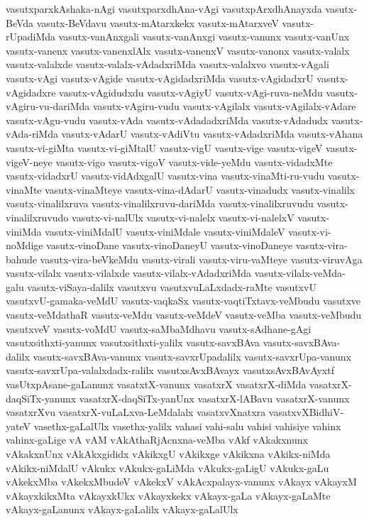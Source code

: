 {vasutxparxkAshaka-nAgi
vasutxparxdhAna-vAgi
vasutxpArxdhAnayxda
vasutx-BeVda
vasutx-BeVdavu
vasutx-mAtarxkekx
vasutx-mAtarxveV
vasutx-rUpadiMda
vasutx-vanAnxgali
vasutx-vanAnxgi
vasutx-vanunx
vasutx-vanUnx
vasutx-vanenx
vasutx-vanenxlAlx
vasutx-vanenxV
vasutx-vanonx
vasutx-valalx
vasutx-valalxde
vasutx-valalx-vAdadxriMda
vasutx-valalxvo
vasutx-vAgali
vasutx-vAgi
vasutx-vAgide
vasutx-vAgidadxriMda
vasutx-vAgidadxrU
vasutx-vAgidadxre
vasutx-vAgidudxdu
vasutx-vAgiyU
vasutx-vAgi-ruva-neMdu
vasutx-vAgiru-vu-dariMda
vasutx-vAgiru-vudu
vasutx-vAgilalx
vasutx-vAgilalx-vAdare
vasutx-vAgu-vudu
vasutx-vAda
vasutx-vAdadadxriMda
vasutx-vAdadudx
vasutx-vAda-riMda
vasutx-vAdarU
vasutx-vAdiVtu
vasutx-vAdadxriMda
vasutx-vAhana
vasutx-vi-giMta
vasutx-vi-giMtalU
vasutx-vigU
vasutx-vige
vasutx-vigeV
vasutx-vigeV-neye
vasutx-vigo
vasutx-vigoV
vasutx-vide-yeMdu
vasutx-vidadxMte
vasutx-vidadxrU
vasutx-vidAdxgalU
vasutx-vina
vasutx-vinaMti-ru-vudu
vasutx-vinaMte
vasutx-vinaMteye
vasutx-vina-dAdarU
vasutx-vinadudx
vasutx-vinalilx
vasutx-vinalilxruva
vasutx-vinalilxruvu-dariMda
vasutx-vinalilxruvudu
vasutx-vinalilxruvudo
vasutx-vi-nalUlx
vasutx-vi-nalelx
vasutx-vi-nalelxV
vasutx-viniMda
vasutx-viniMdalU
vasutx-viniMdale
vasutx-viniMdaleV
vasutx-vi-noMdige
vasutx-vinoDane
vasutx-vinoDaneyU
vasutx-vinoDaneye
vasutx-vira-bahude
vasutx-vira-beVkeMdu
vasutx-virali
vasutx-viru-vaMteye
vasutx-viruvAga
vasutx-vilalx
vasutx-vilalxde
vasutx-vilalx-vAdadxriMda
vasutx-vilalx-veMda-galu
vasutx-viSaya-dalilx
vasutxvu
vasutxvuLaLxdadx-raMte
vasutxvU
vasutxvU-gamaka-veMdU
vasutx-vaqkaSx
vasutx-vaqtiTxtavx-veMbudu
vasutxve
vasutx-veMdathaR
vasutx-veMdu
vasutx-veMdeV
vasutx-veMba
vasutx-veMbudu
vasutxveV
vasutx-voMdU
vasutx-saMbaMdhavu
vasutx-sAdhane-gAgi
vasutxsithxti-yanunx
vasutxsithxti-yalilx
vasutx-savxBAva
vasutx-savxBAva-dalilx
vasutx-savxBAva-vanunx
vasutx-savxrUpadalilx
vasutx-savxrUpa-vanunx
vasutx-savxrUpa-valalxdadx-ralilx
vasutxsAvxBAvayx
vasutxsAvxBAvAyxtf
vasUtxpAsane-gaLanunx
vasatxtX-vanunx
vasatxrX
vasatxrX-diMda
vasatxrX-daqSiTx-yanunx
vasatxrX-daqSiTx-yanUnx
vasatxrX-lABavu
vasatxrX-vanunx
vasatxrXvu
vasatxrX-vuLaLxva-LeMdalalx
vasatxvXnatxra
vasatxvXBidhiV-yateV
vasethx-gaLalUlx
vasethx-yalilx
vahasi
vahi-salu
vahisi
vahisiye
vahinx
vahinx-gaLige
vA
vAM
vAkAthaRjAcnxna-veMba
vAkf
vAkakxnunx
vAkakxnUnx
vAkAkxgididx
vAkikxgU
vAkikxge
vAkikxna
vAkikx-niMda
vAkikx-niMdalU
vAkukx
vAkukx-gaLiMda
vAkukx-gaLigU
vAkukx-gaLu
vAkekxMba
vAkekxMbudeV
vAkekxV
vAkAcxpalayx-vanunx
vAkayx
vAkayxM
vAkayxkikxMta
vAkayxkUkx
vAkayxkekx
vAkayx-gaLa
vAkayx-gaLaMte
vAkayx-gaLanunx
vAkayx-gaLalilx
vAkayx-gaLalUlx
}

